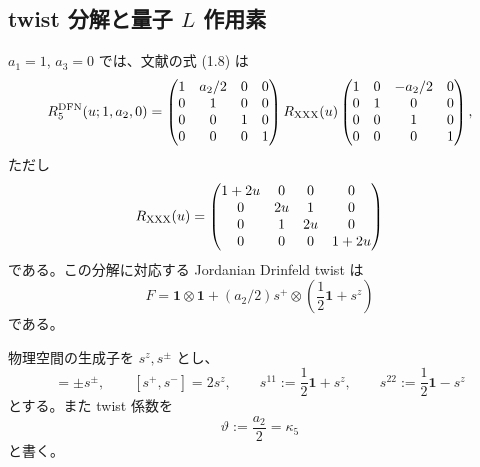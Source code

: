 \subsection{twist 分解と量子 $L$ 作用素}

$a_1=1$, $a_3=0$ では、文献\cite{DFN2026}の式 (1.8) は
\begin{equation}
R^{\rm DFN}_5(u;1,a_2,0)
=
\begin{pmatrix}1&a_2/2&0&0\\0&1&0&0\\0&0&1&0\\0&0&0&1\end{pmatrix}
R_{\rm XXX}(u)
\begin{pmatrix}1&0&-a_2/2&0\\0&1&0&0\\0&0&1&0\\0&0&0&1\end{pmatrix},
\label{eq:c5corr-R-factorization}
\end{equation}
ただし
\begin{equation}
R_{\rm XXX}(u)=
\begin{pmatrix}
1+2u&0&0&0\\
0&2u&1&0\\
0&1&2u&0\\
0&0&0&1+2u
\end{pmatrix}
\end{equation}
である。この分解に対応する Jordanian Drinfeld twist は
\begin{equation}
F=\mathbf1\otimes\mathbf1+(a_2/2)s^+\otimes
\left(\frac12\mathbf1+s^z\right)
\label{eq:c5corr-twist-F}
\end{equation}
である。

物理空間の生成子を $s^z,s^\pm$ とし、
\begin{equation}
[s^z,s^\pm]=\pm s^\pm,
\qquad [s^+,s^-]=2s^z,
\qquad
s^{11}:=\frac12\mathbf1+s^z,
\qquad
s^{22}:=\frac12\mathbf1-s^z
\label{eq:c5corr-su2}
\end{equation}
とする。また twist 係数を
\begin{equation}
\vartheta:=\frac{a_2}{2}=\kappa_5
\label{eq:c5corr-theta}
\end{equation}
と書く。

